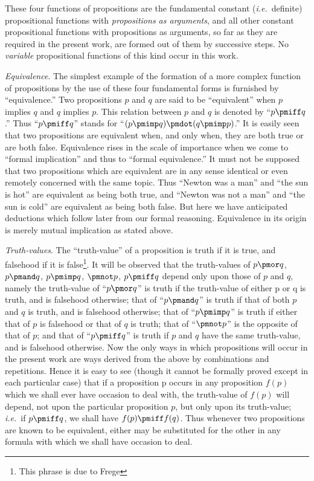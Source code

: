 \documentclass[letterpaper,12pt,openany,leqno]{book}
\newcommand{\pagefirst}[1]{\marginnote[\boxed{\text{#1}}]{\boxed{\text{#1}}}}
\begin{document}
These four functions of propositions are the fundamental constant (\textit{i.e.}\ definite) propositional functions with \textit{propositions as arguments}, and all other constant propositional functions with propositions as arguments, so far as they are required in the present work, are formed out of them by successive steps. No \textit{variable} propositional functions of this kind occur in this work.

\textit{Equivalence}. The simplest example of the formation of a more complex function of propositions by the use of these four fundamental forms is furnished by ``equivalence.'' Two propositions $p$ and $q$ are said to be ``equivalent'' when $p$ implies $q$ and $q$ implies $p$. This relation between $p$ and $q$ is denoted by ``$p \pmiff q$.'' Thus ``$p \pmiff q$'' stands for ``$(p \pmimp q) \pmdot (q \pmimp p)$.'' It is easily seen that two propositions are equivalent when, and only when, they are both true or are both false. Equivalence rises in the scale of importance when we come to ``formal implication'' and thus to ``formal equivalence.'' It must not be supposed that two propositions which are equivalent are in \pagefirst{8} any sense identical or even remotely concerned with the same topic. Thus ``Newton was a man'' and ``the sun is hot'' are equivalent as being both true, and ``Newton was not a man'' and ``the sun is cold'' are equivalent as being both false. But here we have anticipated deductions which follow later from our formal reasoning. Equivalence in its origin is merely mutual implication as stated above.

\textit{Truth-values}. The ``truth-value'' of a proposition is truth if it is true, and falsehood if it is false\footnote{This phrase is due to Frege}. It will be observed that the truth-values of $p \pmor q$, $p \pmand q$, $p \pmimp q$, $\pmnot p$, $p \pmiff q$ depend only upon those of $p$ and $q$, namely the truth-value of ``$p \pmor q$'' is truth if the truth-value of either p or q is truth, and is falsehood otherwise; that of ``$p \pmand q$'' is truth if that of both $p$ and $q$ is truth, and is falsehood otherwise; that of ``$p \pmimp q$'' is truth if either that of $p$ is falsehood or that of $q$ is truth; that of ``$\pmnot p$'' is the opposite of that of $p$; and that of ``$p \pmiff q$'' is truth if $p$ and $q$ have the same truth-value, and is falsehood otherwise. Now the only ways in which propositions will occur in the present work are ways derived from the above by combinations and repetitions. Hence it is easy to see (though it cannot be formally proved except in each particular case) that if a proposition p occurs in any proposition $f(p)$ which we shall ever have occasion to deal with, the truth-value of $f(p)$ will depend, not upon the particular proposition $p$, but only upon its truth-value; \textit{i.e.}\ if $p \pmiff q$, we shall have $f(p) \pmiff f(q)$. Thus whenever two
propositions are known to be equivalent, either may be substituted for the other in any formula with which we shall have occasion to deal.
\end{document}
